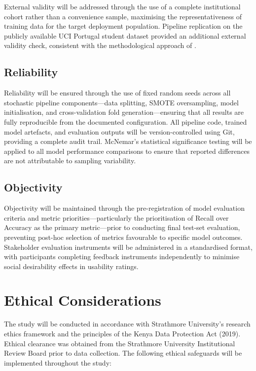 \documentclass[12pt]{report}
\begin{document}
External validity will be addressed through the use of a complete institutional
cohort rather than a convenience sample, maximising the representativeness of
training data for the target deployment population. Pipeline replication on the
publicly available UCI Portugal student dataset \parencite{realinho2021predict}
provided an additional external validity check, consistent with the
methodological approach of \parencite{bettahi2025}.

\subsection{Reliability}

Reliability will be ensured through the use of fixed random seeds across all
stochastic pipeline components---data splitting, SMOTE oversampling, model
initialisation, and cross-validation fold generation---ensuring that all results
are fully reproducible from the documented configuration. All pipeline code,
trained model artefacts, and evaluation outputs will be version-controlled using
Git, providing a complete audit trail. McNemar's statistical significance
testing will be applied to all model performance comparisons to ensure that reported
differences are not attributable to sampling variability.

\subsection{Objectivity}

Objectivity will be maintained through the pre-registration of model evaluation
criteria and metric priorities---particularly the prioritisation of Recall over
Accuracy as the primary metric---prior to conducting final test-set evaluation,
preventing post-hoc selection of metrics favourable to specific model outcomes.
Stakeholder evaluation instruments will be administered in a standardised format,
with participants completing feedback instruments independently to minimise
social desirability effects in usability ratings.

\section{Ethical Considerations}

The study will be conducted in accordance with Strathmore University's research
ethics framework and the principles of the Kenya Data Protection Act (2019).
Ethical clearance was obtained from the Strathmore University Institutional
Review Board prior to data collection. The following ethical safeguards will be
implemented throughout the study:
\end{document}
